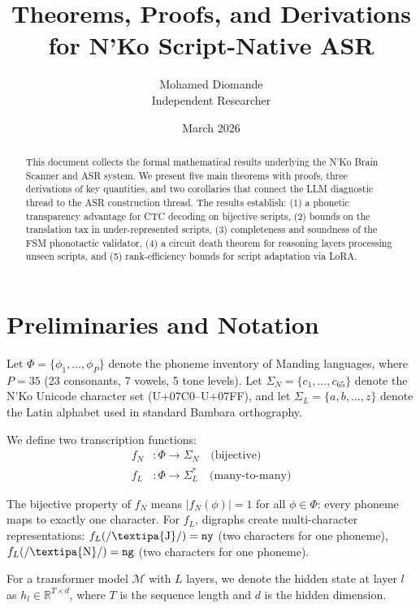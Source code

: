 \documentclass[11pt]{article}
\title{Theorems, Proofs, and Derivations\\for N'Ko Script-Native ASR}
\author{Mohamed Diomande\\Independent Researcher}
\date{March 2026}
\theoremstyle{remark}
\begin{document}
\maketitle

\begin{abstract}
This document collects the formal mathematical results underlying the N'Ko Brain Scanner and ASR system. We present five main theorems with proofs, three derivations of key quantities, and two corollaries that connect the LLM diagnostic thread to the ASR construction thread. The results establish: (1) a phonetic transparency advantage for CTC decoding on bijective scripts, (2) bounds on the translation tax in under-represented scripts, (3) completeness and soundness of the FSM phonotactic validator, (4) a circuit death theorem for reasoning layers processing unseen scripts, and (5) rank-efficiency bounds for script adaptation via LoRA.
\end{abstract}

\tableofcontents
\newpage

\section{Preliminaries and Notation}

Let $\Phi = \{\phi_1, \ldots, \phi_P\}$ denote the phoneme inventory of Manding languages, where $P = 35$ (23 consonants, 7 vowels, 5 tone levels). Let $\Sigma_N = \{c_1, \ldots, c_{65}\}$ denote the N'Ko Unicode character set (U+07C0--U+07FF), and let $\Sigma_L = \{a, b, \ldots, z\}$ denote the Latin alphabet used in standard Bambara orthography.

We define two transcription functions:
\begin{align}
f_N &: \Phi \to \Sigma_N \quad \text{(bijective)} \\
f_L &: \Phi \to \Sigma_L^* \quad \text{(many-to-many)}
\end{align}

The bijective property of $f_N$ means $|f_N(\phi)| = 1$ for all $\phi \in \Phi$: every phoneme maps to exactly one character. For $f_L$, digraphs create multi-character representations: $f_L(\text{/\textipa{J}/}) = \texttt{ny}$ (two characters for one phoneme), $f_L(\text{/\textipa{N}/}) = \texttt{ng}$ (two characters for one phoneme).

For a transformer model $\mathcal{M}$ with $L$ layers, we denote the hidden state at layer $l$ as $h_l \in \mathbb{R}^{T \times d}$, where $T$ is the sequence length and $d$ is the hidden dimension.
\end{document}
